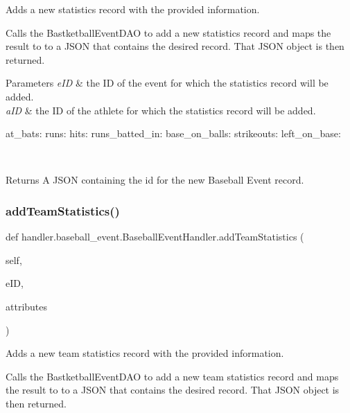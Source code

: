 Adds a new statistics record with the provided information. 

Calls the Bastketball\+Event\+D\+AO to add a new statistics record and maps the result to to a J\+S\+ON that contains the desired record. That J\+S\+ON object is then returned.


\begin{DoxyParams}{Parameters}
{\em e\+ID} & the ID of the event for which the statistics record will be added. \\
\hline
{\em a\+ID} & the ID of the athlete for which the statistics record will be added. \begin{DoxyVerb}           at_bats:
           runs:
           hits:
           runs_batted_in:
           base_on_balls:
           strikeouts:
           left_on_base:
\end{DoxyVerb}
\\
\hline
\end{DoxyParams}
\begin{DoxyReturn}{Returns}
A J\+S\+ON containing the id for the new Baseball Event record. 
\end{DoxyReturn}
\mbox{\label{classhandler_1_1baseball__event_1_1_baseball_event_handler_a1cd2d0154941bfebabfcd2e5008a5535}} 
\subsubsection{\texorpdfstring{add\+Team\+Statistics()}{addTeamStatistics()}}
{\footnotesize\ttfamily def handler.\+baseball\+\_\+event.\+Baseball\+Event\+Handler.\+add\+Team\+Statistics (\begin{DoxyParamCaption}\item[{}]{self,  }\item[{}]{e\+ID,  }\item[{}]{attributes }\end{DoxyParamCaption})}



Adds a new team statistics record with the provided information. 

Calls the Bastketball\+Event\+D\+AO to add a new team statistics record and maps the result to to a J\+S\+ON that contains the desired record. That J\+S\+ON object is then returned.


